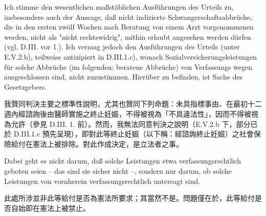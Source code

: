 \documentclass[12pt]{article}
\begin{document}
\begin{sourcepara}[title={原文SondervotumB.316}]
Ich stimme den wesentlichen maßstäblichen Ausführungen des Urteils zu, insbesondere auch der Aussage, daß nicht indizierte Schwangerschaftsabbrüche, die in den ersten zwölf Wochen nach Beratung von einem Arzt vorgenommenen werden, nicht als "nicht rechtswidrig", mithin erlaubt angesehen werden dürfen (vgl. D.III. vor 1.). Ich vermag jedoch den Ausführungen des Urteils (unter E.V.2.b), teilweise antizipiert in D.III.1.c), wonach Sozialversicherungsleistungen für solche Abbrüche (im folgenden: beratene Abbrüche) von Verfassungs wegen ausgeschlossen sind, nicht zuzustimmen. Hierüber zu befinden, ist Sache des Gesetzgebers.
\end{sourcepara}
\begin{transpara}
我贊同判決主要之標準性說明，尤其也贊同下列命題：未具指標事由、在最初十二週內經諮詢後由醫師實施之終止妊娠，不得被視為「不具違法性」，因而不得被視為允許（參見 D.III. 1. 前）。然而，我無法同意判決之說明（E.V.2.b 下，部分已於 D.III.1.c 預先呈現），即對此等終止妊娠（以下稱：經諮詢終止妊娠）之社會保險給付在憲法上被排除。對此作成決定，是立法者之事。
\end{transpara}

\begin{sourcepara}[title={原文SondervotumB.317}]
Dabei geht es nicht darum, daß solche Leistungen etwa verfassungsrechtlich geboten seien -- das sind sie sicher nicht --, sondern nur darum, ob solche Leistungen von vornherein verfassungsrechtlich untersagt sind.
\end{sourcepara}
\begin{transpara}
此處所涉並非此等給付是否為憲法所要求；其當然不是。問題僅在於，此等給付是否自始即在憲法上被禁止。
\end{transpara}
\end{document}
